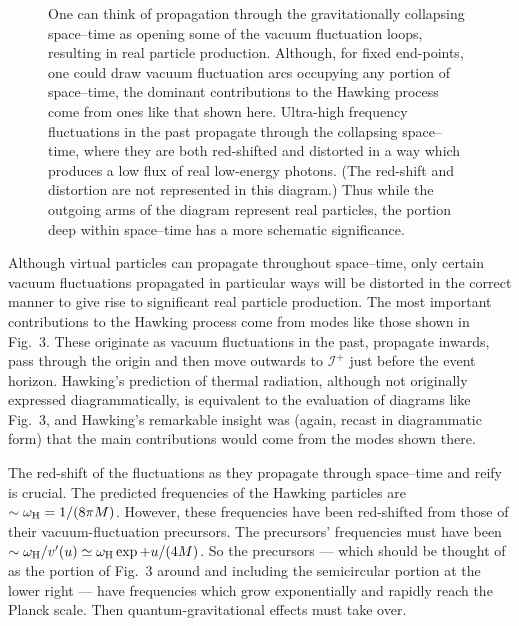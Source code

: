 \documentclass[11pt]{article}
\def\scrif{{\mathcal I}^+}
\begin{document}
\begin{figure}[t]
\epsfxsize=2in
\caption{One can think of propagation through the 
gravitationally collapsing space--time as opening some of the 
vacuum fluctuation loops, resulting in real particle production.  
Although, for fixed end-points, one could draw vacuum fluctuation
arcs occupying any portion of space--time, the dominant contributions
to the Hawking process come from ones like that shown here.
Ultra-high frequency fluctuations in the past propagate through the
collapsing space--time, where they are both red-shifted and distorted
in a way which produces a low flux of real low-energy photons.
(The red-shift and distortion are not represented in this diagram.)
Thus while the outgoing arms of the diagram represent real particles, the
portion deep within space--time has a more schematic significance.
}
\end{figure}

Although virtual particles can propagate throughout space--time, only certain
vacuum fluctuations propagated in particular ways will be distorted in the
correct manner to give rise to significant real particle production.  The most
important contributions to the Hawking process come from modes like those shown
in Fig.~3. These originate as vacuum fluctuations in the past, propagate
inwards, pass through the origin and then move outwards to $\scrif$ just before
the event horizon.  Hawking's prediction of thermal radiation, although not
originally expressed diagrammatically, is equivalent to the evaluation of 
diagrams like Fig.~3, and Hawking's remarkable insight was (again, recast in
diagrammatic form) that the main contributions would come from the modes shown
there.

The red-shift of the fluctuations as they propagate through space--time and
reify is crucial.  The predicted frequencies of the Hawking particles are $\sim
\omega _{\rm H}=1/(8\pi M)$.  However, these frequencies have been red-shifted
from those of their vacuum-fluctuation precursors.  The precursors' frequencies
must have been $\sim \omega _{\rm H}/v'(u)\simeq \omega _{\rm H}\exp +u/(4M)$. 
So the precursors --- which should be thought of as the portion of Fig.~3
around and including the semicircular portion at the lower right --- have
frequencies which grow exponentially and rapidly reach the Planck scale.   Then
quantum-gravitational effects must take over.   
\end{document}

